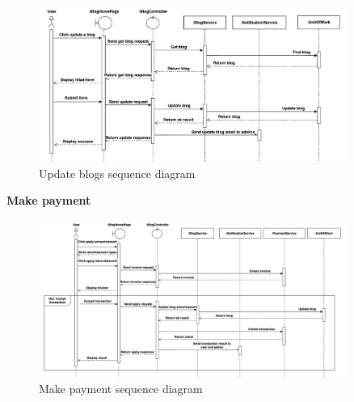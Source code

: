 \begin{figure}[H]
  \centering
  \includegraphics[width=0.9\textwidth]{Figures/update_blog_seq.png}
  \caption{Update blogs sequence diagram}
  \label{fig:update-blog-seq}
\end{figure}
\clearpage
\textbf{Make payment}

\begin{figure}[H]
  \centering
  \includegraphics[width=0.9\textwidth]{Figures/payment_seq.png}
  \caption{Make payment sequence diagram}
  \label{fig:make-payment-seq}
\end{figure}


